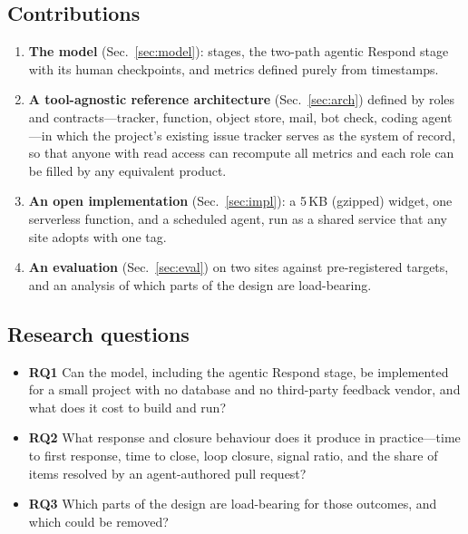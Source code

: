 \subsection{Contributions}
\begin{enumerate}
  \item \textbf{The \ffrs{} model} (Sec.~\ref{sec:model}): stages, the two-path agentic Respond stage with its human checkpoints, and metrics defined purely from timestamps.
  \item \textbf{A tool-agnostic reference architecture} (Sec.~\ref{sec:arch}) defined by roles and contracts---tracker, function, object store, mail, bot check, coding agent---in which the project's existing issue tracker serves as the system of record, so that anyone with read access can recompute all metrics and each role can be filled by any equivalent product.
  \item \textbf{An open implementation} (Sec.~\ref{sec:impl}): a 5\,KB (gzipped) widget, one serverless function, and a scheduled agent, run as a shared service that any site adopts with one tag.
  \item \textbf{An evaluation} (Sec.~\ref{sec:eval}) on two sites against pre-registered targets, and an analysis of which parts of the design are load-bearing.
\end{enumerate}

\subsection{Research questions}
\begin{itemize}
  \item \textbf{RQ1} Can the \ffrs{} model, including the agentic Respond stage, be implemented for a small project with no database and no third-party feedback vendor, and what does it cost to build and run?
  \item \textbf{RQ2} What response and closure behaviour does it produce in practice---time to first response, time to close, loop closure, signal ratio, and the share of items resolved by an agent-authored pull request?
  \item \textbf{RQ3} Which parts of the design are load-bearing for those outcomes, and which could be removed?
\end{itemize}
